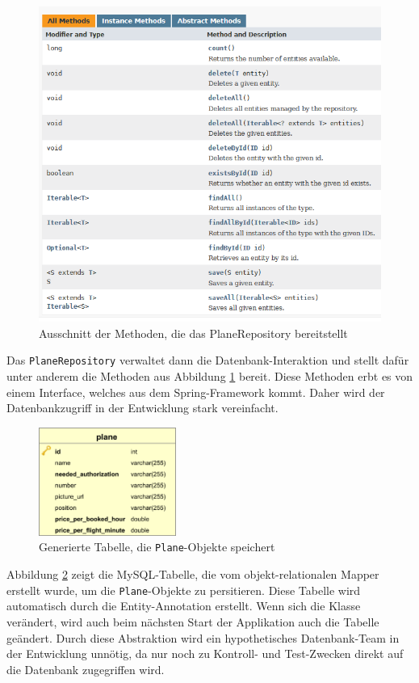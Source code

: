 \documentclass[a4paper, 11pt]{article}
\begin{document}
\begin{figure}[htpb]
    \centering
    \includegraphics[width=\textwidth]{images/crudrepository.png}
    \caption{Ausschnitt der Methoden, die das PlaneRepository bereitstellt}
    \label{fig:crudrepository}
\end{figure}

Das \texttt{PlaneRepository} verwaltet dann die Datenbank-Interaktion und
stellt dafür unter anderem die Methoden aus Abbildung \ref{fig:crudrepository}
bereit. Diese Methoden erbt es von einem Interface, welches aus dem
Spring-Framework kommt. Daher wird der Datenbankzugriff in der Entwicklung
stark vereinfacht.

\begin{figure}[htpb]
    \centering
    \includegraphics[width=0.4\textwidth]{images/erm/plane.png}
    \caption{Generierte Tabelle, die \texttt{Plane}-Objekte speichert}
    \label{fig:plane_table}
\end{figure}

Abbildung \ref{fig:plane_table} zeigt die MySQL-Tabelle, die vom
objekt-relationalen Mapper erstellt wurde, um die \texttt{Plane}-Objekte zu
persitieren. Diese Tabelle wird automatisch durch die Entity-Annotation
erstellt. Wenn sich die Klasse verändert, wird auch beim nächsten Start der
Applikation auch die Tabelle geändert. Durch diese Abstraktion wird ein
hypothetisches Datenbank-Team in der Entwicklung unnötig, da nur noch zu
Kontroll- und Test-Zwecken direkt auf die Datenbank zugegriffen wird.
\end{document}
